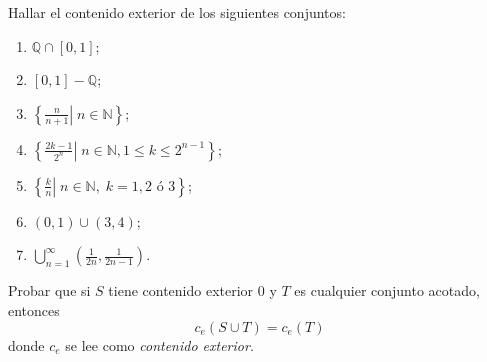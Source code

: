 \documentclass{book}
\newcommand{\qq}{\mathbb{Q}}
\newcommand{\nn}{\mathbb{N}}
\begin{document}
\begin{ejer}{} Hallar el contenido exterior de los siguientes conjuntos: 
\begin{enumerate}
\item $\qq \cap [0,1]$;
\item $[0,1]-\qq$;
\item $\left\{\frac{n}{n+1}\left. \right|\; n\in\nn\right\}$;
\item $\left\{\frac{2k-1}{2^n}\left. \right|\; n\in\nn, 1\leq k\leq 2^{n-1}\right\}$;
\item $\left\{\frac{k}{n}\left. \right|\; n\in\nn, \;k=1,2 \mbox{ \'o  } 3\right\}$;
\item $(0,1)\cup(3,4)$;
\item $\bigcup\limits_{n=1}^{\infty} \left(\frac{1}{2n},\frac{1}{2n-1}\right)$.
\end{enumerate}


\end{ejer}  

\begin{ejer}{} Probar que si $S$ tiene contenido exterior 0 y $T$ es cualquier conjunto acotado, entonces
\[
c_e(S\cup T)=c_e(T)
\]
donde $c_e$ se lee como \textit{contenido exterior}.

\end{ejer} 
\end{document}
